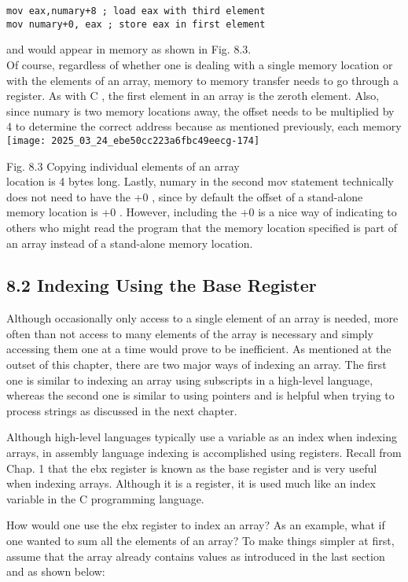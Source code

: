 \documentclass[10pt]{article}
\begin{document}
\begin{verbatim}
mov eax,numary+8 ; load eax with third element
mov numary+0, eax ; store eax in first element
\end{verbatim}

and would appear in memory as shown in Fig. 8.3.\\
Of course, regardless of whether one is dealing with a single memory location or with the elements of an array, memory to memory transfer needs to go through a register. As with C , the first element in an array is the zeroth element. Also, since numary is two memory locations away, the offset needs to be multiplied by 4 to determine the correct address because as mentioned previously, each memory\\
\texttt{[image: 2025\_03\_24\_ebe50cc223a6fbc49eecg-174]}

Fig. 8.3 Copying individual elements of an array\\
location is 4 bytes long. Lastly, numary in the second mov statement technically does not need to have the +0 , since by default the offset of a stand-alone memory location is +0 . However, including the +0 is a nice way of indicating to others who might read the program that the memory location specified is part of an array instead of a stand-alone memory location.

\subsection*{8.2 Indexing Using the Base Register}
Although occasionally only access to a single element of an array is needed, more often than not access to many elements of the array is necessary and simply accessing them one at a time would prove to be inefficient. As mentioned at the outset of this chapter, there are two major ways of indexing an array. The first one is similar to indexing an array using subscripts in a high-level language, whereas the second one is similar to using pointers and is helpful when trying to process strings as discussed in the next chapter.

Although high-level languages typically use a variable as an index when indexing arrays, in assembly language indexing is accomplished using registers. Recall from Chap. 1 that the ebx register is known as the base register and is very useful when indexing arrays. Although it is a register, it is used much like an index variable in the C programming language.

How would one use the ebx register to index an array? As an example, what if one wanted to sum all the elements of an array? To make things simpler at first, assume that the array already contains values as introduced in the last section and as shown below:
\end{document}
